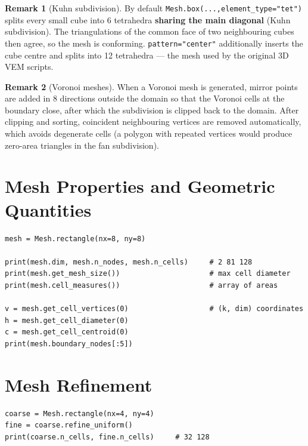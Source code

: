 \documentclass[11pt,oneside]{book}
\theoremstyle{definition}
\newtheorem{remark}{Remark}[chapter]
\theoremstyle{plain}
\newcommand{\code}[1]{\texttt{#1}}
\begin{document}
\begin{remark}[Kuhn subdivision]
By default \code{Mesh.box(...,\allowbreak element\_\allowbreak type="tet")} splits every small cube into 6
tetrahedra \textbf{sharing the main diagonal} (Kuhn subdivision). The triangulations
of the common face of two neighbouring cubes then agree, so the mesh is conforming.
\code{pattern="center"} additionally inserts the cube centre and splits into 12
tetrahedra --- the mesh used by the original 3D VEM scripts.
\end{remark}

\begin{remark}[Voronoi meshes]
When a Voronoi mesh is generated, mirror points are added in 8 directions outside
the domain so that the Voronoi cells at the boundary close, after which the
subdivision is clipped back to the domain. After clipping and sorting, coincident
neighbouring vertices are removed automatically, which avoids degenerate cells (a
polygon with repeated vertices would produce zero-area triangles in the fan
subdivision).
\end{remark}

\section{Mesh Properties and Geometric Quantities}

\begin{lstlisting}[language=MosicaFE,caption={Reading mesh information}]
mesh = Mesh.rectangle(nx=8, ny=8)

print(mesh.dim, mesh.n_nodes, mesh.n_cells)     # 2 81 128
print(mesh.get_mesh_size())                     # max cell diameter
print(mesh.cell_measures())                     # array of areas

v = mesh.get_cell_vertices(0)                   # (k, dim) coordinates
h = mesh.get_cell_diameter(0)
c = mesh.get_cell_centroid(0)
print(mesh.boundary_nodes[:5])
\end{lstlisting}

\section{Mesh Refinement}

\begin{lstlisting}[language=MosicaFE,caption={Uniform refinement}]
coarse = Mesh.rectangle(nx=4, ny=4)
fine = coarse.refine_uniform()
print(coarse.n_cells, fine.n_cells)     # 32 128
\end{lstlisting}
\end{document}
